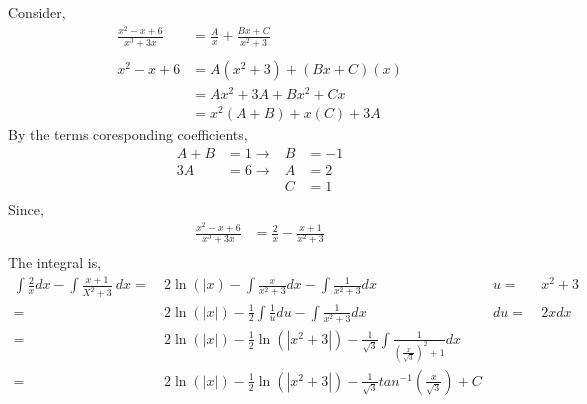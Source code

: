 \documentclass[10pt,letterpaper,cm]{hmcpset}
\begin{document}
Consider,\\
\begin{align*}
  \frac{x^2 - x + 6}{x^3+3x} &= \frac{A}{x} + \frac{Bx+C}{x^2+3}\\
  \\x^2-x+6&=A(x^2+3)+(Bx+C)(x)\\
           &=Ax^2+3A+Bx^2+Cx\\
           &=x^2(A+B)+x(C) + 3A
\end{align*}
By the terms coresponding coefficients,
\begin{align*}
          A+B &= 1 \rightarrow& B&=-1\\
          3A  &=6 \rightarrow& A&=2\\  
           && C &=1\\
\end{align*}
Since,
\begin{align*}
  \frac{x^2 - x + 6}{x^3+3x} &= \frac{2}{x} - \frac{x+1}{x^2+3}\\
\end{align*}
The integral is,
\begin{align*}
  \int\frac{2}{x}dx - \int\frac{x+1}{X^2+3}~dx =&~2\ln(|x) - \int\frac{x}{x^2+3}dx
  - \int\frac{1}{x^2+3}dx &u=&~x^2+3 \\
  =&~2\ln\left( |x| \right)-\frac{1}{2}\int\frac{1}{u}du
  - \int\frac{1}{x^2+3}dx &du=&~2xdx \\
  =&~2\ln\left( |x| \right)-\frac{1}{2} \ln(|x^2+3|)
  - \frac{1}{\sqrt{3}}\int\frac{1}{\left( \frac{x}{\sqrt{3}} \right)^2+1} dx \\
  =&~2\ln\left( |x| \right)-\frac{1}{2} \ln(|x^2+3|)
  - \frac{1}{\sqrt{3}}tan^{-1}\left( \frac{x}{\sqrt{3}}\right) + C \\
\end{align*}
\end{document}
